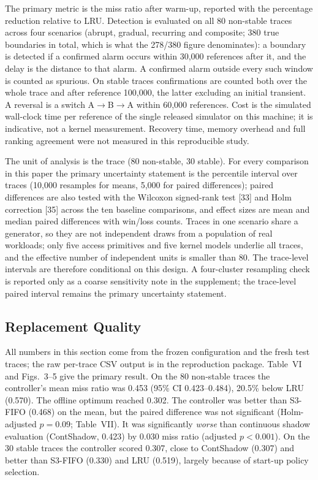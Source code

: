 \documentclass[10pt,twocolumn,a4paper]{IEEEtran}
\begin{document}
The primary metric is the miss ratio after warm-up, reported with the
percentage reduction relative to LRU. Detection is evaluated on all 80
non-stable traces across four scenarios (abrupt, gradual, recurring and
composite; 380 true boundaries in total, which is what the 278/380 figure
denominates): a boundary is detected if a confirmed alarm occurs within
30,000 references after it, and the delay is the distance to that alarm. A
confirmed alarm outside every such window is counted as spurious. On stable
traces confirmations are counted both over the whole trace and after reference
100,000, the latter excluding an initial transient. A reversal is a switch
A$\to$B$\to$A within 60,000 references. Cost is the simulated wall-clock time per reference of the single
released simulator on this machine; it is indicative, not a kernel measurement.
Recovery time, memory overhead and full ranking agreement were not measured in
this reproducible study.

The unit of analysis is the trace (80 non-stable, 30 stable). For every
comparison in this paper the primary uncertainty statement is the percentile
interval over traces (10,000 resamples for means, 5,000 for paired
differences); paired differences are also tested with the Wilcoxon signed-rank
test [33] and Holm correction [35] across the ten baseline comparisons, and
effect sizes are mean and median paired differences with win/loss counts.
Traces in one scenario share a generator, so they are not independent draws
from a population of real workloads; only five access primitives and five
kernel models underlie all traces, and the effective number of independent
units is smaller than 80. The trace-level intervals are therefore conditional
on this design. A four-cluster resampling check is reported only as a coarse sensitivity
note in the supplement; the trace-level paired interval remains the primary
uncertainty statement.

\subsection{Replacement Quality}

All numbers in this section come from the frozen configuration and the fresh
test traces; the raw per-trace CSV output is in the reproduction package.
Table~VI and Figs.~3--5 give the primary result. On the 80 non-stable traces
the controller's mean miss ratio was 0.453 (95\% CI 0.423--0.484), 20.5\%
below LRU (0.570). The offline optimum reached 0.302. The controller was
better than S3-FIFO (0.468) on the mean, but the paired difference was not
significant (Holm-adjusted $p = 0.09$; Table~VII). It was significantly
\emph{worse} than continuous shadow evaluation (ContShadow, 0.423) by 0.030
miss ratio (adjusted $p < 0.001$). On the 30 stable traces the controller
scored 0.307, close to ContShadow (0.307) and better than S3-FIFO (0.330) and
LRU (0.519), largely because of start-up policy selection.
\end{document}
